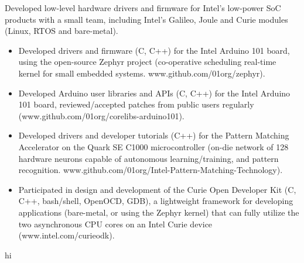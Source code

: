 \documentclass[6pt]{article}
\begin{document}
\begin{minipage}{35em}
\begin{minipage}{12em}
{}
\end{minipage}
\break
\break
Developed low-level hardware drivers and firmware for Intel's low-power SoC products
with a small team, including Intel's Galileo, Joule and Curie modules (Linux, RTOS and
bare-metal).
\begin{itemize}
    \item Developed drivers and firmware (C, C++) for the Intel Arduino 101 board, using the
          open-source Zephyr project (co-operative scheduling real-time kernel for small
          embedded systems. www.github.com/01org/zephyr).
    \item Developed Arduino user libraries and APIs (C, C++) for the Intel Arduino 101 board,
          reviewed/accepted patches from public users regularly \\
          (www.github.com/01org/corelibs-arduino101).
    \item Developed drivers and developer tutorials (C++) for the Pattern Matching Accelerator
          on the Quark SE C1000 microcontroller (on-die network of 128 hardware neurons
          capable of autonomous learning/training, and pattern recognition.
          www.github.com/01org/Intel-Pattern-Matching-Technology).
    \item Participated in design and development of the Curie Open Developer Kit (C, C++,
          bash/shell, OpenOCD, GDB), a lightweight framework for developing applications
          (bare-metal, or using the Zephyr kernel) that can fully utilize the two asynchronous
          CPU cores on an Intel Curie device (www.intel.com/curieodk).
\end{itemize}
\end{minipage}
%
%
\hspace*{-\parindent}%
\begin{minipage}{15em}
    hi
\end{minipage}
\end{document}
